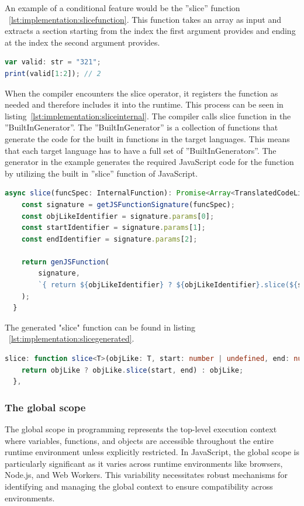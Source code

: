 An example of a conditional feature would be the ''slice'' function ~\ref{lst:implementation:slicefunction}. This function takes an array as input and extracts a section starting from the index the first argument provides and ending at the index the second argument provides.

\begin{lstlisting}[language=TypeScript,caption=The Slice Operation,label=lst:implementation:slicefunction]
var valid: str = "321";
print(valid[1:2]); // 2
\end{lstlisting}

When the compiler encounters the slice operator, it registers the function as needed and therefore includes it into the runtime. This process can be seen in listing~\ref{lst:implementation:sliceinternal}. The compiler calls slice function in the ''BuiltInGenerator''. The ''BuiltInGenerator'' is a collection of functions that generate the code for the built in functions in the target languages. This means that each target language has to have a full set of ''BuiltInGenerators''. The generator in the example generates the required JavaScript code for the function by utilizing the built in ''slice'' function of JavaScript.

\begin{lstlisting}[language=TypeScript,caption=Slice in the JavaScript BuiltInGenerator,label=lst:implementation:sliceinternal]
async slice(funcSpec: InternalFunction): Promise<Array<TranslatedCodeLine>> {
	const signature = getJSFunctionSignature(funcSpec);
	const objLikeIdentifier = signature.params[0];
	const startIdentifier = signature.params[1];
	const endIdentifier = signature.params[2];

	return genJSFunction(
		signature,
		`{ return ${objLikeIdentifier} ? ${objLikeIdentifier}.slice(${startIdentifier}, ${endIdentifier}) : ${objLikeIdentifier}; }`,
	);
  }
\end{lstlisting}

The generated "slice" function can be found in listing ~\ref{lst:implementation:slicegenerated}.

\begin{lstlisting}[language=TypeScript,caption=Slice in the target language,label=lst:implementation:slicegenerated]
slice: function slice<T>(objLike: T, start: number | undefined, end: number | undefined): T {
	return objLike ? objLike.slice(start, end) : objLike;
  },
\end{lstlisting}

\subsubsection{The global scope}
The global scope in programming represents the top-level execution context where variables, functions, and objects are accessible throughout the entire runtime environment unless explicitly restricted. In JavaScript, the global scope is particularly significant as it varies across runtime environments like browsers, Node.js, and Web Workers. This variability necessitates robust mechanisms for identifying and managing the global context to ensure compatibility across environments.

